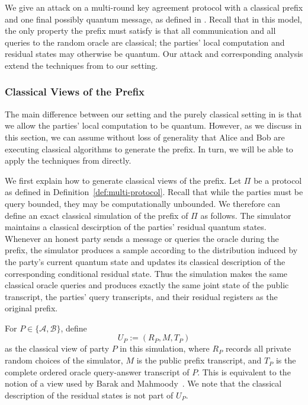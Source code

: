 \documentclass[11pt]{article}
\newcounter{algorithm}
\newcommand{\cA}{\mathcal{A}}
\newcommand{\cB}{\mathcal{B}}
\begin{document}
We give an attack on a multi-round key agreement protocol with a classical prefix and one final possibly quantum message, as defined in 
. Recall that in this model, the only property the prefix must satisfy is that all communication and all queries to the random oracle are classical;
the parties' local computation and residual states may otherwise be
quantum.  Our attack and corresponding analysis extend the techniques from \cite{BarakMahmoodyFull} to our setting.

\subsubsection{Classical Views of the Prefix}
\label{sec:classical-prefix-views}

The main difference between our setting and the purely classical setting in \cite{BarakMahmoodyFull} is that we allow the parties' local computation to be quantum. However, as we discuss in this section, we can assume without loss of generality that Alice and Bob are executing classical algorithms to generate the prefix. In turn, we will be able to apply the techniques from \cite{BarakMahmoodyFull} directly. 

We first explain how to generate classical views of the prefix. Let $\Pi$ be a protocol as defined in Definition~\ref{def:multi-protocol}. Recall that while the parties must be query bounded, they may be computationally unbounded. We therefore can define an exact classical
simulation of the prefix of $\Pi$ as follows. The simulator maintains a classical descirption of the parties' residual quantum states. Whenever an honest party sends a
message or queries the oracle during the prefix, the simulator produces a sample according to the distribution induced by the party's current
quantum state and updates its classical description of the corresponding
conditional residual state. Thus the simulation makes the same classical
oracle queries and produces exactly the same joint state of the public
transcript, the parties' query transcripts, and their residual registers as
the original prefix.

For $P\in\{\cA,\cB\}$, define
\[
  U_P := (R_P,M,T_P)
\]
as the classical view of party $P$ in this simulation, where $R_P$ records all
private random choices of the simulator, $M$ is the public prefix transcript,
and $T_P$ is the complete ordered oracle query-answer transcript of $P$.
This is equivalent to the notion of a view used by Barak and
Mahmoody~\cite[Section~3.1]{BarakMahmoodyFull}.  We note that the classical description of the residual states is not part of $U_P$.
\end{document}
